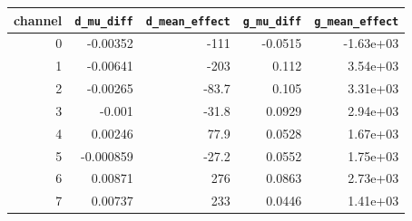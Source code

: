 \begin{tabular}{rrrrr}
\toprule
channel & \texttt{d\_mu\_diff} & \texttt{d\_mean\_effect} & \texttt{g\_mu\_diff} & \texttt{g\_mean\_effect} \\
\midrule
0 & -0.00352 & -111 & -0.0515 & -1.63e+03 \\
1 & -0.00641 & -203 & 0.112 & 3.54e+03 \\
2 & -0.00265 & -83.7 & 0.105 & 3.31e+03 \\
3 & -0.001 & -31.8 & 0.0929 & 2.94e+03 \\
4 & 0.00246 & 77.9 & 0.0528 & 1.67e+03 \\
5 & -0.000859 & -27.2 & 0.0552 & 1.75e+03 \\
6 & 0.00871 & 276 & 0.0863 & 2.73e+03 \\
7 & 0.00737 & 233 & 0.0446 & 1.41e+03 \\
\bottomrule
\end{tabular}

